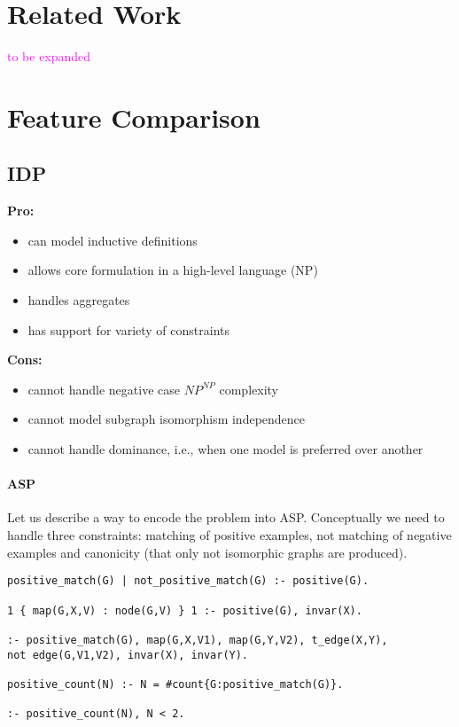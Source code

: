 \documentclass{article}
\theoremstyle{definition}
\newcommand{\sergey}[1]{\textcolor{magenta}{\marginpar{\sc Sergey} #1}}
\begin{document}
\section{Related Work}
\sergey{to be expanded}


\section{Feature Comparison}

\subsection{IDP} 

\textbf{Pro:}
\begin{itemize}
  \item can model inductive definitions
  \item allows core formulation in a high-level language (NP)
  \item handles aggregates
  \item has support for variety of constraints
\end{itemize}
\textbf{Cons:}
\begin{itemize}
  \item cannot handle negative case $\textit{NP}^\textit{NP}$ complexity
  \item cannot model subgraph isomorphism independence
  \item cannot handle dominance, i.e., when one model is preferred over another 
\end{itemize}

\paragraph{ASP}
Let us describe a way to encode the problem into ASP. Conceptually we need to handle three constraints: matching of positive examples, not matching of negative examples and canonicity (that only not isomorphic graphs are produced).

\lstset{basicstyle=\footnotesize\ttfamily,breaklines=true}
\begin{lstlisting}[caption=ASP positive matching, style=model]
positive_match(G) | not_positive_match(G) :- positive(G).

1 { map(G,X,V) : node(G,V) } 1 :- positive(G), invar(X).

:- positive_match(G), map(G,X,V1), map(G,Y,V2), t_edge(X,Y), 
not edge(G,V1,V2), invar(X), invar(Y).

positive_count(N) :- N = #count{G:positive_match(G)}.

:- positive_count(N), N < 2.
\end{lstlisting}
\end{document}
